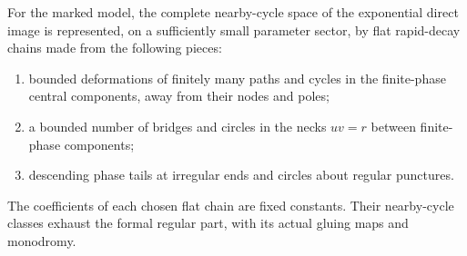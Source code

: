\begin{lemma}\label{lem:regularlifting}
For the marked model, the complete nearby-cycle space of the
exponential direct image is represented, on a sufficiently small
parameter sector, by flat rapid-decay chains made from the following
pieces:
\begin{enumerate}
\item bounded deformations of finitely many paths and cycles in
the finite-phase central components, away from their nodes and poles;
\item a bounded number of bridges and circles in the necks
$uv=r$ between finite-phase components;
\item descending phase tails at irregular ends and circles about
regular punctures.
\end{enumerate}
The coefficients of each chosen flat chain are fixed constants.
Their nearby-cycle classes exhaust the formal regular part, with
its actual gluing maps and monodromy.
\end{lemma}
